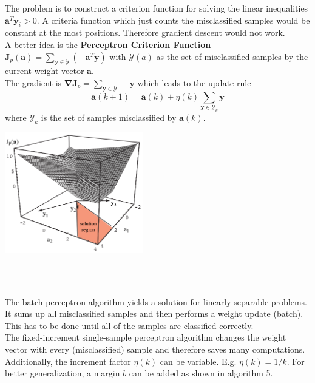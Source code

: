   \begin{minipage}{12cm}
    The problem is to construct a criterion function for solving the linear inequalities $\bm a^T \bm y_i > 0$. 
    A criteria function which just counts the misclassified samples would be constant at the most positions. 
    Therefore gradient descent would not work. \\
    
    A better idea is the \textbf{Perceptron Criterion Function}
    $\bm J_p(\bm a) = \sum\limits_{\bm y \in \mathcal{Y}} (-\bm a^T \bm y)$  with $\mathcal{Y}(a)$ as the set
    of misclassified samples by the current weight vector $\bm a$.\\
    The gradient is $\bm {\nabla J}_p = \sum\limits_{\bm y\in \mathcal{Y}} -\bm y$
    which leads to the update rule 
    \begin{equation*}
        \bm a(k+1) = \bm a(k) + \eta(k) \sum\limits_{\bm y\in \mathcal{Y}_k} \bm y
    \end{equation*}
    where $\mathcal{Y}_k$ is the set of samples misclassified by $\bm a(k)$.
       
   	\end{minipage}
    \hspace{8mm} 
    \begin{minipage}{6cm}
    	 \includegraphics[width=6cm]{./images/perceptron.png}
    \end{minipage} \\
    
    \begin{multicols}{3}
        \\
        The batch perceptron algorithm yields a solution for linearly separable problems. 
        It sums up all misclassified samples and then performs a weight update (batch). 
        This has to be done until all of the samples are classified correctly.  
    \vfill
    \columnbreak
        \\
        The fixed-increment single-sample perceptron algorithm changes the weight vector
        with every (misclassified) sample and therefore saves many computations.
    \vfill
    \columnbreak
        \\
        Additionally, the increment factor $\eta(k)$ can be variable. E.g. $\eta(k)=1/k$. For better 
        generalization, a margin $b$ can be added as shown in algorithm 5.  
    \end{multicols}

